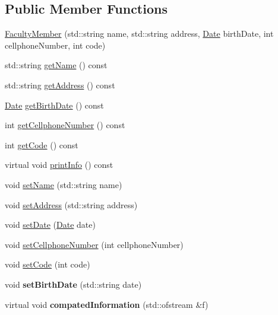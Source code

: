 \subsection*{Public Member Functions}
\begin{DoxyCompactItemize}
\item 
\hyperlink{classFacultyMember_a02d3bfb88e071e17053309606544ca29}{Faculty\+Member} (std\+::string name, std\+::string address, \hyperlink{classDate}{Date} birth\+Date, int cellphone\+Number, int code)
\item 
std\+::string \hyperlink{classFacultyMember_a31db85e875c2cfaa8a23d46ab24cf3d6}{get\+Name} () const
\item 
std\+::string \hyperlink{classFacultyMember_a014ef6fda0eedf6644a46504958790f9}{get\+Address} () const
\item 
\hyperlink{classDate}{Date} \hyperlink{classFacultyMember_add1edcb7b45d0061dea8c8ba06cfe7b4}{get\+Birth\+Date} () const
\item 
int \hyperlink{classFacultyMember_a865d91cdeec9e344021da0cf6c9fc29e}{get\+Cellphone\+Number} () const
\item 
int \hyperlink{classFacultyMember_a475a9855e4587df3022c997732ef43b4}{get\+Code} () const
\item 
virtual void \hyperlink{classFacultyMember_af07c814d58d1a2e309c74a0c57b95fd1}{print\+Info} () const
\item 
void \hyperlink{classFacultyMember_a7e4ef8e1a740e7e46d17ed9df43bc5d8}{set\+Name} (std\+::string name)
\item 
void \hyperlink{classFacultyMember_a25dc17f307ac885a7b3722a7685cb517}{set\+Address} (std\+::string address)
\item 
void \hyperlink{classFacultyMember_abec27c8af8bd8274a3ea560da0f12cbd}{set\+Date} (\hyperlink{classDate}{Date} date)
\item 
void \hyperlink{classFacultyMember_aceb0270b28a96e52cfe138c26f3936a4}{set\+Cellphone\+Number} (int cellphone\+Number)
\item 
void \hyperlink{classFacultyMember_acb54ae36938fc1b96bdb1ae8060c29c1}{set\+Code} (int code)
\item 
\mbox{\label{classFacultyMember_a263ea4bc1cb7eb281a2fb6f5d1581fda}} 
void {\bfseries set\+Birth\+Date} (std\+::string date)
\item 
\mbox{\label{classFacultyMember_ab5722a59419ab94768c82d0749c1b687}} 
virtual void {\bfseries compated\+Information} (std\+::ofstream \&f)
\end{DoxyCompactItemize}
